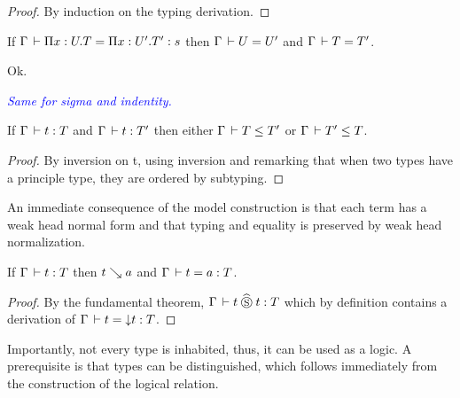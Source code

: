 \documentclass[a4paper,english]{lipics-utf8x}
\newcommand\meta[1]{\noindent\textcolor{blue}{\emph{#1}}}
\begin{document}
  \begin{proof}
    By induction on the typing derivation.
  \end{proof}

  \begin{lemma}
    If $\Gamma \,\vdash \Pi x:U.T = \Pi x:U'.T' : s$ then $\Gamma \,\vdash U = U'$
    and $\Gamma \,\vdash T = T'$.
  \end{lemma}
  Ok.

  \meta{Same for sigma and indentity.}

  \begin{lemma}
    If $\Gamma \,\vdash t : T$ and $\Gamma \,\vdash t : T'$ then either
    $\Gamma \,\vdash T \le T'$ or $\Gamma \,\vdash T' \le T$.
  \end{lemma}

  \begin{proof}
    By inversion on t, using inversion and remarking that when two types
    have a principle type, they are ordered by subtyping.
  \end{proof}


  An immediate consequence of the model construction is that each term has a
  weak head normal form and that typing and equality is preserved by weak head
  normalization.

  \begin{theorem}
    If $\Gamma \,\vdash t : T$ then $t \searrow a$ and $\Gamma \,\vdash t = a : T$.
  \end{theorem}

  \begin{proof}
    By the fundamental theorem, $\Gamma \,\vdash t \mathrel{\widehat{\mathrel{\circledS}}} t : T$ which by definition
    contains a derivation of $\Gamma \,\vdash t = {\downarrow} t : T$.
  \end{proof}


  Importantly, not every type is inhabited, thus, it can be used as a logic.
  A prerequisite is that types can be distinguished, which follows immediately
  from the construction of the logical relation.
\end{document}
